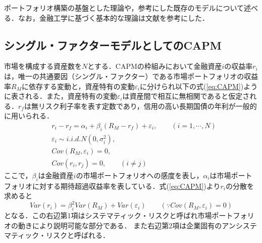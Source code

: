 ﻿\documentclass[a4paper]{jarticle}
\begin{document}
ポートフォリオ構築の基盤とした理論や，参考にした既存のモデルについて述べる．なお，金融工学に基づく基本的な理論は文献\cite{analyst}\cite{finance}を参考にした．


\subsection{シングル・ファクターモデルとしてのCAPM}
市場を構成する資産数を$N$とする．CAPMの枠組みにおいて金融資産$i$の収益率$r_i$は，唯一の共通要因（シングル・ファクター）である市場ポートフォリオの収益率$R_M$に依存する変動と，資産特有の変動$\varepsilon_i$に分けられ以下の式(\ref{eq:CAPM})ように表される．また，資産特有の変動$\varepsilon_i$は資産間で相互に無相関であると仮定される．$r_f$は無リスク利子率を表す定数であり，信用の高い長期国債の年利が一般的に用いられる．
\begin{equation}
\begin{split}
&r_i - r_f = \alpha_i + \beta_i(R_M - r_f) + \varepsilon_i,\qquad(i=1,\cdots,N)\\
&\varepsilon_i \sim i.i.d.N(0,\sigma_i^2),\\
&Cov(R_M, \varepsilon_i) = 0,\\
&Cov(r_i, r_j) = 0, \qquad (i \neq j)
\label{eq:CAPM}
\end{split}
\end{equation}
ここで，$\beta_i$は金融資産$i$の市場ポートフォリオへの感度を表し，$\alpha_i$は市場ポートフォリオに対する期待超過収益率を表している．式(\ref{eq:CAPM})より$r_i$の分散を求めると
\begin{equation}
Var(r_i) = \beta_i^2Var(R_M) + Var(\varepsilon_i) \qquad (\text{∵}Cov(R_M, \varepsilon_i) = 0)
\label{eq:CAPM_var}
\end{equation}
となる．この右辺第1項はシステマティック・リスクと呼ばれ市場ポートフォリオの動きにより説明可能な部分である．
また右辺第2項は企業固有のアンシステマティック・リスクと呼ばれる．
\end{document}
